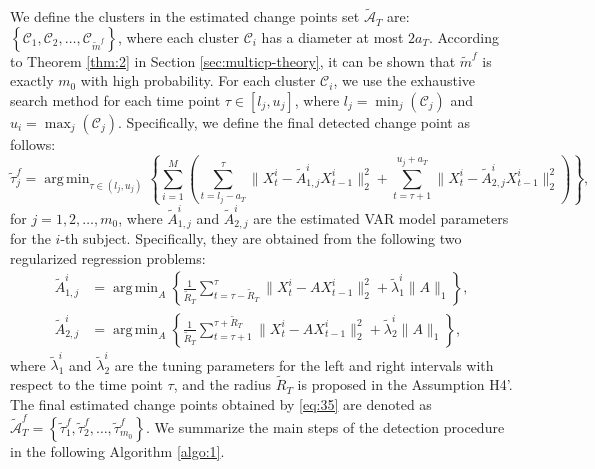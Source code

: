 \documentclass[11pt]{article}
\DeclareMathOperator*{\argmin}{arg\,min}
\begin{document}
We define the clusters in the estimated change points set $\widetilde{\mathcal{A}}_T$ are: $\left\{ \mathcal{C}_1, \mathcal{C}_2, \dots, \mathcal{C}_{\widetilde{m}^f}\right\}$, where each cluster $\mathcal{C}_i$ has a diameter at most $2a_T$. According to Theorem \ref{thm:2} in Section \ref{sec:multicp-theory}, it can be shown that $\widetilde{m}^f$ is exactly $m_0$ with high probability. For each cluster $\mathcal{C}_i$, we use the exhaustive search method for each time point $\tau \in [l_j, u_j]$, where $l_j = \min_j(\mathcal{C}_j)$ and $u_i = \max_j(\mathcal{C}_j)$. Specifically, we define the final detected change point as follows:
\begin{equation}
    \label{eq:35}
    \widetilde{\tau}_j^f = \argmin_{\tau \in (l_j,u_j)}\left\{ \sum_{i=1}^M\left(\sum_{t=l_j-a_T}^{\tau}\|X_t^i - \widetilde{A}_{1,j}^iX_{t-1}^i\|_2^2 + \sum_{t=\tau+1}^{u_j+a_T}\|X_t^i - \widetilde{A}_{2,j}^iX_{t-1}^i\|_2^2\right) \right\},
\end{equation}
for $j=1,2,\dots, m_0$, where $\widetilde{A}_{1,j}^i$ and $\widetilde{A}_{2,j}^i$ are the estimated VAR model parameters for the $i$-th subject. Specifically, they are obtained from the following two regularized regression problems:
\begin{equation*}
    \begin{aligned}
        \widetilde{A}^i_{1,j} &= \argmin_{A}\left\{ \frac{1}{\widetilde{R}_T}\sum_{t=\tau-\widetilde{R}_T}^{\tau}\|X_t^i - AX_{t-1}^i\|_2^2 + \widetilde{\lambda}_1^i\|A\|_1 \right\}, \\
        \widetilde{A}^i_{2,j} &= \argmin_{A}\left\{ \frac{1}{\widetilde{R}_T}\sum_{t=\tau+1}^{\tau+\widetilde{R}_T}\|X_t^i - AX_{t-1}^i\|_2^2 + \widetilde{\lambda}_2^i\|A\|_1 \right\},
    \end{aligned}
\end{equation*}
where $\widetilde{\lambda}_1^i$ and $\widetilde{\lambda}_2^i$ are the tuning parameters for the left and right intervals with respect to the time point $\tau$, and the radius $\widetilde{R}_T$ is proposed in the Assumption H4'. The final estimated change points obtained by \eqref{eq:35} are denoted as $\widetilde{\mathcal{A}}_T^f = \left\{ \widetilde{\tau}_1^f, \widetilde{\tau}_2^f, \dots, \widetilde{\tau}_{m_0}^f \right\}$. We summarize the main steps of the detection procedure in the following Algorithm \ref{algo:1}. 
\end{document}
